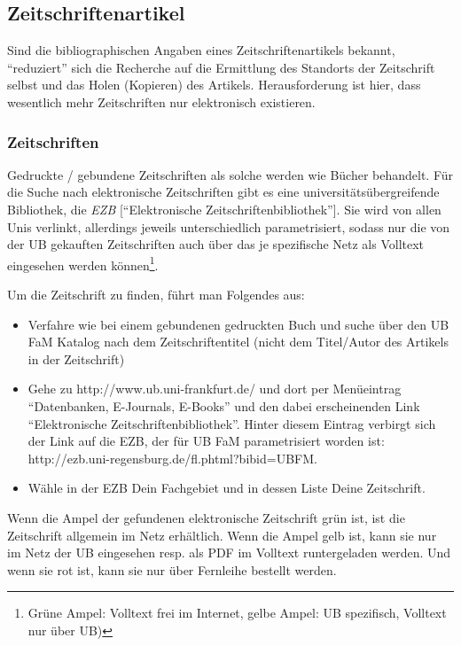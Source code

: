 \documentclass[
  DIV=calc,
  BCOR=5mm,
  11pt,
  headings=small,
  oneside,
  abstract=true,
  toc=bib,
  english,ngerman]{scrartcl}
\begin{document}
\subsection{Zeitschriftenartikel}

Sind die bibliographischen Angaben eines Zeitschriftenartikels bekannt,
\enquote{reduziert} sich die Recherche auf die Ermittlung des Standorts der
Zeitschrift selbst und das Holen (Kopieren) des Artikels. Herausforderung ist
hier, dass wesentlich mehr Zeitschriften nur elektronisch existieren.

\subsubsection{Zeitschriften}

Gedruckte / gebundene Zeitschriften als solche werden wie Bücher behandelt. Für
die Suche nach elektronische Zeitschriften gibt es eine
universitätsübergreifende Bibliothek, die \emph{EZB} [\enquote{Elektronische
Zeitschriftenbibliothek}]. Sie wird von allen Unis verlinkt, allerdings
jeweils unterschiedlich parametrisiert, sodass nur die von der UB gekauften
Zeitschriften auch über das je spezifische Netz als Volltext eingesehen werden
können\footnote{Grüne Ampel: Volltext frei im Internet, gelbe Ampel: UB
spezifisch, Volltext nur über UB)}.

Um die Zeitschrift zu finden, führt man Folgendes aus:


\begin{itemize}
  \item Verfahre wie bei einem gebundenen gedruckten Buch und suche über den UB
  FaM Katalog nach dem Zeitschriftentitel (nicht dem Titel/Autor des Artikels
  in der Zeitschrift)
  \item Gehe zu {\ttfamily http://www.ub.uni-frankfurt.de/} und dort per
  Menüeintrag \enquote{Datenbanken, E-Journals, E-Books} und den dabei
  erscheinenden Link \enquote{Elektronische Zeitschriftenbibliothek}. Hinter
  diesem Eintrag verbirgt sich der Link auf die EZB, der für UB FaM
  parametrisiert worden ist: {\ttfamily
  http://ezb.uni-regensburg.de/fl.phtml?bibid=UBFM}.
  \item Wähle in der EZB Dein Fachgebiet und in dessen Liste Deine
  Zeitschrift.
\end{itemize}

Wenn die Ampel der gefundenen elektronische Zeitschrift grün ist, ist die
Zeitschrift allgemein im Netz erhältlich. Wenn die Ampel gelb ist, kann sie nur
im Netz der UB eingesehen resp. als PDF im Volltext runtergeladen werden. Und
wenn sie rot ist, kann sie nur über Fernleihe bestellt werden.
  
\end{document}
